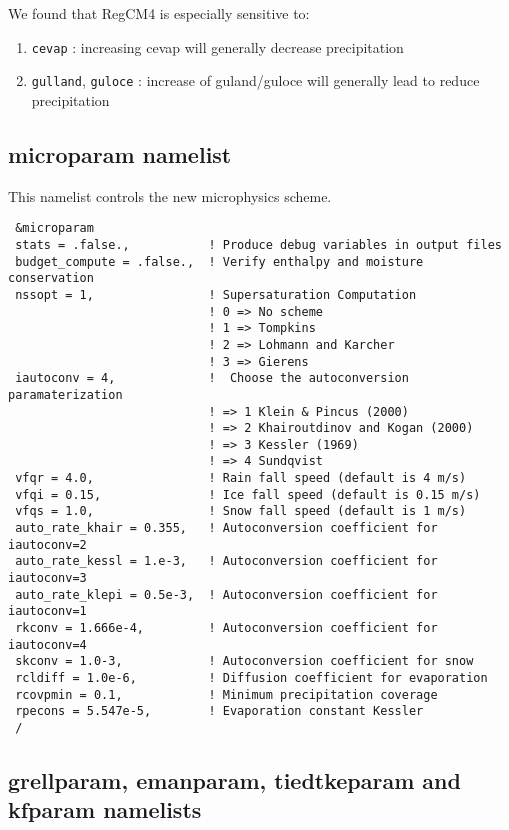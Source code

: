 We found that RegCM4 is especially sensitive to:

\begin{enumerate}
\item \verb=cevap= : increasing cevap will generally decrease precipitation
\item \verb=gulland=, \verb=guloce= : increase of guland/guloce will generally
lead to reduce precipitation
\end{enumerate}

\subsection{microparam namelist}

This namelist controls the new microphysics scheme.

{\footnotesize
\begin{Verbatim}
 &microparam
 stats = .false.,           ! Produce debug variables in output files
 budget_compute = .false.,  ! Verify enthalpy and moisture conservation
 nssopt = 1,                ! Supersaturation Computation
                            ! 0 => No scheme
                            ! 1 => Tompkins
                            ! 2 => Lohmann and Karcher
                            ! 3 => Gierens
 iautoconv = 4,             !  Choose the autoconversion paramaterization
                            ! => 1 Klein & Pincus (2000)
                            ! => 2 Khairoutdinov and Kogan (2000)
                            ! => 3 Kessler (1969)
                            ! => 4 Sundqvist
 vfqr = 4.0,                ! Rain fall speed (default is 4 m/s)
 vfqi = 0.15,               ! Ice fall speed (default is 0.15 m/s)
 vfqs = 1.0,                ! Snow fall speed (default is 1 m/s)
 auto_rate_khair = 0.355,   ! Autoconversion coefficient for iautoconv=2
 auto_rate_kessl = 1.e-3,   ! Autoconversion coefficient for iautoconv=3
 auto_rate_klepi = 0.5e-3,  ! Autoconversion coefficient for iautoconv=1
 rkconv = 1.666e-4,         ! Autoconversion coefficient for iautoconv=4
 skconv = 1.0-3,            ! Autoconversion coefficient for snow
 rcldiff = 1.0e-6,          ! Diffusion coefficient for evaporation
 rcovpmin = 0.1,            ! Minimum precipitation coverage
 rpecons = 5.547e-5,        ! Evaporation constant Kessler
 /
\end{Verbatim}
}

\subsection{grellparam, emanparam, tiedtkeparam and kfparam namelists}

